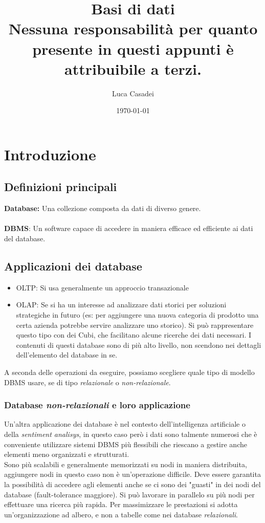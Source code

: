 \documentclass[a4paper,12pt]{report}
\title{\textbf{Basi di dati}\\Nessuna responsabilità per quanto presente in questi appunti è attribuibile a terzi.}
\author{Luca Casadei}
\date{\today}
\begin{document}
	\maketitle
	\tableofcontents
	\chapter{Introduzione}
	\section{Definizioni principali}
	\textbf{Database:} Una collezione composta da dati di diverso genere.\\\\
	\textbf{DBMS}: Un software capace di accedere in maniera efficace ed efficiente ai dati del database.\\
	\section{Applicazioni dei database}
	\begin{itemize}
		\item OLTP: Si usa generalmente un approccio transazionale
		\item OLAP: Se si ha un interesse ad analizzare dati storici per soluzioni strategiche in futuro (es: per aggiungere una nuova categoria di prodotto una certa azienda potrebbe servire analizzare uno storico). Si può rappresentare questo tipo con dei Cubi, che facilitano alcune ricerche dei dati necessari. I contenuti di questi database sono di più alto livello, non scendono nei dettagli dell'elemento del database in se.
	\end{itemize}
A seconda delle operazioni da eseguire, possiamo scegliere quale tipo di modello DBMS usare, se di tipo \textit{relazionale} o \textit{non-relazionale}.
\subsection*{Database \textit{non-relazionali} e loro applicazione}
Un'altra applicazione dei database è nel contesto dell'intelligenza artificiale o della \textit{sentiment analisys}, in questo caso però i dati sono talmente numerosi che è conveniente utilizzare sistemi DBMS più flessibili che riescano a gestire anche elementi meno organizzati e strutturati.\\
Sono più scalabili e generalmente memorizzati su nodi in maniera distribuita, aggiungere nodi in questo caso non è un'operazione difficile.
Deve essere garantita la possibilità di accedere agli elementi anche se ci sono dei "guasti" in dei nodi del database (fault-tolerance maggiore). Si può lavorare in parallelo su più nodi per effettuare una ricerca più rapida. Per massimizzare le prestazioni si adotta un'organizzazione ad albero, e non a tabelle come nei database \textit{relazionali}.
\end{document}
